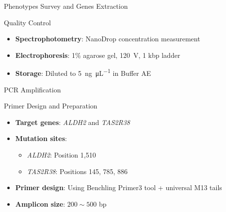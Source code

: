 \documentclass[10pt,hyperref={colorlinks,citecolor=blue,urlcolor=peking_blue,linkcolor=}]{beamer}
\theoremstyle{plain}
\begin{document}
\begin{frame}{Phenotypes Survey and Genes Extraction}
    \begin{block}{Quality Control}
        \begin{itemize}
            \item \textbf{Spectrophotometry}: NanoDrop concentration measurement
            \item \textbf{Electrophoresis}: 1\% agarose gel, \qty{120}{\V}, 1 kbp ladder
            \item \textbf{Storage}: Diluted to \qty{5}{\ng \per \uL} in Buffer AE
        \end{itemize}
    \end{block}
\end{frame}

\begin{frame}{PCR Amplification}

    \begin{block}{Primer Design and Preparation}
        \begin{itemize}
            \item \textbf{Target genes}: \textit{ALDH2} and \textit{TAS2R38}
            \item \textbf{Mutation sites}: 
            \begin{itemize}
                  \item \textit{ALDH2}: Position 1,510
                  \item \textit{TAS2R38}: Positions 145, 785, 886
            \end{itemize}
            \item \textbf{Primer design}: Using Benchling Primer3 tool + universal M13 tails
            \item \textbf{Amplicon size}: $200\sim500$ bp
        \end{itemize}
    \end{block}
    

\end{frame}
\end{document}
